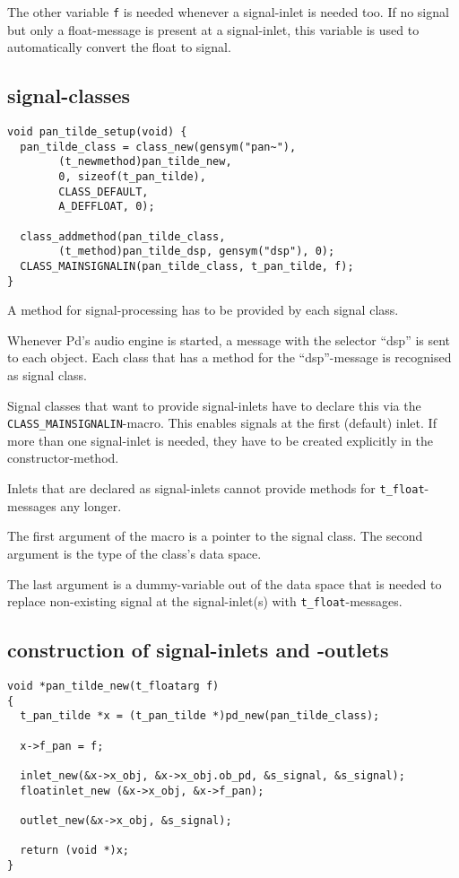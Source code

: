 \documentclass[12pt, a4paper,english,titlepage]{article}
\begin{document}
The other variable \verb+f+ is needed whenever a signal-inlet is needed too.
If no signal but only a float-message is present at a signal-inlet, this
variable is used to automatically convert the float to signal.

\subsection{signal-classes}

\begin{verbatim}
void pan_tilde_setup(void) {
  pan_tilde_class = class_new(gensym("pan~"),
        (t_newmethod)pan_tilde_new,
        0, sizeof(t_pan_tilde),
        CLASS_DEFAULT, 
        A_DEFFLOAT, 0);

  class_addmethod(pan_tilde_class,
        (t_method)pan_tilde_dsp, gensym("dsp"), 0);
  CLASS_MAINSIGNALIN(pan_tilde_class, t_pan_tilde, f);
}
\end{verbatim}

A method for signal-processing has to be provided by each signal class.

Whenever Pd's audio engine is started, a message with the selector ``dsp''
is sent to each object.
Each class that has a method for the ``dsp''-message is recognised as signal class.

Signal classes that want to provide signal-inlets have to
declare this via the \verb+CLASS_MAINSIGNALIN+-macro.
This enables signals at the first (default) inlet.
If more than one signal-inlet is needed, they have to be created explicitly
in the constructor-method.

Inlets that are declared as signal-inlets cannot provide
methods for \verb+t_float+-messages any longer.

The first argument of the macro is a pointer to the signal class.
The second argument is the type of the class's data space.

The last argument is a dummy-variable out of the data space that is needed
to replace non-existing signal at the signal-inlet(s) with \verb+t_float+-messages.

\subsection{construction of signal-inlets and -outlets}

\begin{verbatim}
void *pan_tilde_new(t_floatarg f)
{
  t_pan_tilde *x = (t_pan_tilde *)pd_new(pan_tilde_class);

  x->f_pan = f;
  
  inlet_new(&x->x_obj, &x->x_obj.ob_pd, &s_signal, &s_signal);
  floatinlet_new (&x->x_obj, &x->f_pan);

  outlet_new(&x->x_obj, &s_signal);

  return (void *)x;
}
\end{verbatim}
\end{document}
